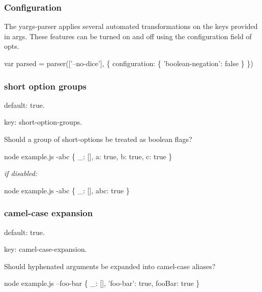 \label{_configuration}%
 \subsubsection*{Configuration}

The yargs-\/parser applies several automated transformations on the keys provided in {\ttfamily args}. These features can be turned on and off using the {\ttfamily configuration} field of {\ttfamily opts}.


\begin{DoxyCode}
var parsed = parser(['--no-dice'], \{
  configuration: \{
    'boolean-negation': false
  \}
\})
\end{DoxyCode}


\subsubsection*{short option groups}


\begin{DoxyItemize}
\item default\+: {\ttfamily true}.
\item key\+: {\ttfamily short-\/option-\/groups}.
\end{DoxyItemize}

Should a group of short-\/options be treated as boolean flags?


\begin{DoxyCode}
node example.js -abc
\{ \_: [], a: true, b: true, c: true \}
\end{DoxyCode}


{\itshape if disabled\+:}


\begin{DoxyCode}
node example.js -abc
\{ \_: [], abc: true \}
\end{DoxyCode}


\subsubsection*{camel-\/case expansion}


\begin{DoxyItemize}
\item default\+: {\ttfamily true}.
\item key\+: {\ttfamily camel-\/case-\/expansion}.
\end{DoxyItemize}

Should hyphenated arguments be expanded into camel-\/case aliases?


\begin{DoxyCode}
node example.js --foo-bar
\{ \_: [], 'foo-bar': true, fooBar: true \}
\end{DoxyCode}


